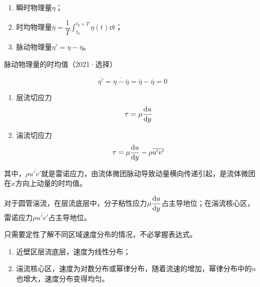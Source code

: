 
\begin{enumerate}
	\item 瞬时物理量$\eta$；
	\item 时均物理量$\displaystyle \overline{\eta} = \dfrac{1}{T} \int_{t_0}^{t_0 + T} \eta(t) \dd{t}$；
	\item 脉动物理量$\eta' = \eta - \overline{\eta}$。
\end{enumerate}

脉动物理量的时均值（2021·选择）

\begin{equation}
	\overline{\eta'} = \overline{\eta - \overline{\eta}} = \overline{\eta} - \overline{\eta} = 0
\end{equation}


\begin{enumerate}
	\item 层流切应力
	\begin{equation*}
		\tau = \mu\dv{u}{y}
	\end{equation*}
    \item 湍流切应力
    \begin{equation}
    	\tau = \mu\dv{u}{y} - \rho \overline{u' v'}
    \end{equation}
\end{enumerate}

其中，$\rho \overline{u' v'}$就是雷诺应力，由流体微团脉动导致动量横向传递引起，是流体微团在$x$方向上动量的时均值。

对于圆管湍流，在层流底层中，分子粘性应力$\displaystyle \mu \dv{u}{y}$占主导地位；在湍流核心区，雷诺应力$\rho \overline{u' v'}$占主导地位。


只需要定性了解不同区域速度分布的情况，不必掌握表达式。

\begin{enumerate}
	\item 近壁区层流底层，速度为线性分布；
	\item 湍流核心区，速度为对数分布或幂律分布，随着流速的增加，幂律分布中的$n$也增大，速度分布变得均匀。
\end{enumerate}
